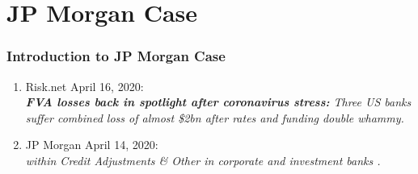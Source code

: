 \documentclass[main.tex]{subfiles}
\begin{document}
    \section{JP Morgan Case}

    \begin{frame}
        \frametitle{Introduction to JP Morgan Case}

        \begin{enumerate}
            \item Risk.net April 16, 2020: \\
            \textit{%
                \textbf{FVA losses back in spotlight after coronavirus stress:} 
                Three US banks suffer combined loss of almost 
                \$2bn after rates and funding double whammy.
            }
            \item JP Morgan April 14, 2020: \\
            \textit{%
                \underline{} 
                within Credit Adjustments \& Other in corporate and investment banks 
                \underline{}.
            }
        \end{enumerate}

        \begin{center}
            \resizebox{.85\textwidth}{!}{%
                
            }
        \end{center}
    \end{frame}
\end{document}
